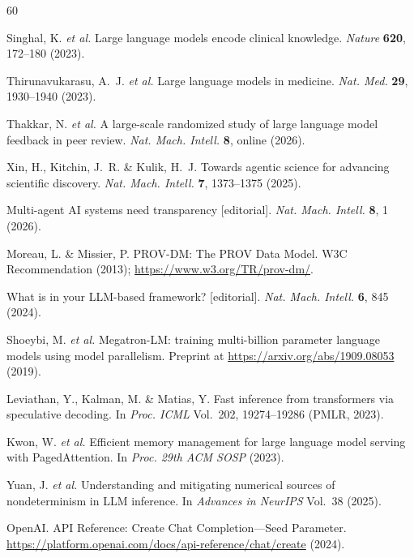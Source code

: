 \documentclass[sn-nature]{sn-jnl}
\providecommand{\DIFaddbegin}{} %
\providecommand{\DIFaddend}{} %
\providecommand{\DIFdelbegin}{} %
\providecommand{\DIFdelend}{} %
\providecommand{\DIFscaledelfig}{0.5}
\newlength{\DIFdelgraphicswidth} %
\newlength{\DIFdelgraphicsheight} %
\providecommand{\DIFaddincludegraphics}[2][]{{\color{blue}\fbox{\DIFOincludegraphics[#1]{#2}}}} %
\providecommand{\DIFdelincludegraphics}[2][]{%
\sbox{\DIFdelgraphicsbox}{\DIFOincludegraphics[#1]{#2}}%
\settoboxwidth{\DIFdelgraphicswidth}{\DIFdelgraphicsbox} %
\settoboxtotalheight{\DIFdelgraphicsheight}{\DIFdelgraphicsbox} %
\scalebox{\DIFscaledelfig}{%
\parbox[b]{\DIFdelgraphicswidth}{\usebox{\DIFdelgraphicsbox}\\[-\baselineskip] \rule{\DIFdelgraphicswidth}{0em}}\llap{\resizebox{\DIFdelgraphicswidth}{\DIFdelgraphicsheight}{%
\setlength{\unitlength}{\DIFdelgraphicswidth}%
\begin{picture}(1,1)%
\thicklines\linethickness{2pt} %
{\color[rgb]{1,0,0}\put(0,0){\framebox(1,1){}}}%
{\color[rgb]{1,0,0}\put(0,0){\line( 1,1){1}}}%
{\color[rgb]{1,0,0}\put(0,1){\line(1,-1){1}}}%
\end{picture}%
}\hspace*{3pt}}} %
} %
\DeclareRobustCommand{\DIFaddbegin}{\DIFOaddbegin \let\includegraphics\DIFaddincludegraphics} %
\DeclareRobustCommand{\DIFaddend}{\DIFOaddend \let\includegraphics\DIFOincludegraphics} %
\DeclareRobustCommand{\DIFdelbegin}{\DIFOdelbegin \let\includegraphics\DIFdelincludegraphics} %
\DeclareRobustCommand{\DIFdelend}{\DIFOaddend \let\includegraphics\DIFOincludegraphics} %
\begin{document}
\DIFdelbegin %
\DIFdelend \DIFaddbegin \begin{thebibliography}{60}
\DIFaddend 

Singhal, K. \emph{et al.}
Large language models encode clinical knowledge.
\emph{Nature} \textbf{620}, 172--180 (2023).

Thirunavukarasu, A.~J. \emph{et al.}
Large language models in medicine.
\emph{Nat. Med.} \textbf{29}, 1930--1940 (2023).

Thakkar, N. \emph{et al.}
A large-scale randomized study of large language model feedback in peer review.
\emph{Nat. Mach. Intell.} \textbf{8}, online (2026).

Xin, H., Kitchin, J.~R. \& Kulik, H.~J.
Towards agentic science for advancing scientific discovery.
\emph{Nat. Mach. Intell.} \textbf{7}, 1373--1375 (2025).

Multi-agent AI systems need transparency [editorial].
\emph{Nat. Mach. Intell.} \textbf{8}, 1 (2026).

Moreau, L. \& Missier, P.
PROV-DM: The PROV Data Model.
W3C Recommendation (2013); \url{https://www.w3.org/TR/prov-dm/}.

What is in your LLM-based framework? [editorial].
\emph{Nat. Mach. Intell.} \textbf{6}, 845 (2024).

Shoeybi, M. \emph{et al.}
Megatron-LM: training multi-billion parameter language models using model parallelism.
Preprint at \url{https://arxiv.org/abs/1909.08053} (2019).

Leviathan, Y., Kalman, M. \& Matias, Y.
Fast inference from transformers via speculative decoding.
In \emph{Proc. ICML} Vol.~202, 19274--19286 (PMLR, 2023).

Kwon, W. \emph{et al.}
Efficient memory management for large language model serving with PagedAttention.
In \emph{Proc. 29th ACM SOSP} (2023).

Yuan, J. \emph{et al.}
Understanding and mitigating numerical sources of nondeterminism in LLM inference.
In \emph{Advances in NeurIPS} Vol.~38 (2025).

OpenAI. API Reference: Create Chat Completion---Seed Parameter.
\url{https://platform.openai.com/docs/api-reference/chat/create} (2024).


\end{thebibliography}
\end{document}
